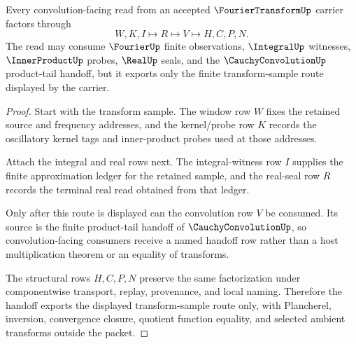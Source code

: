\begin{theorem}\label{thm:fourier-transform-convolution-handoff}
Every convolution-facing read from an accepted $\FourierTransformUp$ carrier factors through
$$
W,K,I \longmapsto R \longmapsto V \longmapsto H,C,P,N .
$$
The read may consume $\FourierUp$ finite observations, $\IntegralUp$ witnesses, $\InnerProductUp$ probes, $\RealUp$ seals, and the $\CauchyConvolutionUp$ product-tail handoff, but it exports only the finite transform-sample route displayed by the carrier.
\end{theorem}
\begin{proof}
Start with the transform sample. The window row $W$ fixes the retained source and frequency addresses, and the kernel/probe row $K$ records the oscillatory kernel tags and inner-product probes used at those addresses.

Attach the integral and real rows next. The integral-witness row $I$ supplies the finite approximation ledger for the retained sample, and the real-seal row $R$ records the terminal real read obtained from that ledger.

Only after this route is displayed can the convolution row $V$ be consumed. Its source is the finite product-tail handoff of $\CauchyConvolutionUp$, so convolution-facing consumers receive a named handoff row rather than a host multiplication theorem or an equality of transforms.

The structural rows $H,C,P,N$ preserve the same factorization under componentwise transport, replay, provenance, and local naming. Therefore the handoff exports the displayed transform-sample route only, with Plancherel, inversion, convergence closure, quotient function equality, and selected ambient transforms outside the packet.
\end{proof}



